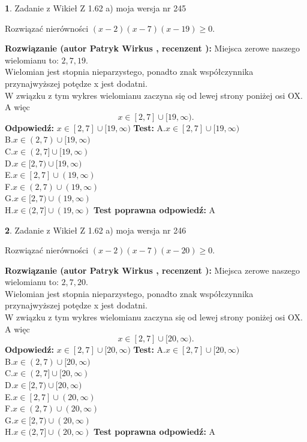 \documentclass[12pt, a4paper]{article}
\theoremstyle{definition} %
\newtheorem{zad}{}
\newcommand{\zadStart}[1]{\begin{zad}#1\newline}
\newcommand{\zadStop}{\end{zad}}
\newcommand{\rozwStart}[2]{\noindent \textbf{Rozwiązanie (autor #1 , recenzent #2): }\newline}
\newcommand{\rozwStop}{\newline}
\newcommand{\odpStart}{\noindent \textbf{Odpowiedź:}\newline}
\newcommand{\odpStop}{\newline}
\newcommand{\testStart}{\noindent \textbf{Test:}\newline}
\newcommand{\testStop}{\newline}
\newcommand{\kluczStart}{\noindent \textbf{Test poprawna odpowiedź:}\newline}
\newcommand{\kluczStop}{\newline}
\begin{document}
\zadStart{Zadanie z Wikieł Z 1.62 a) moja wersja nr 245}

Rozwiązać nierówności $(x-2)(x-7)(x-19)\ge0$.
\zadStop
\rozwStart{Patryk Wirkus}{}
Miejsca zerowe naszego wielomianu to: $2, 7, 19$.\\
Wielomian jest stopnia nieparzystego, ponadto znak współczynnika przy\linebreak najwyższej potędze x jest dodatni.\\ W związku z tym wykres wielomianu zaczyna się od lewej strony poniżej osi OX. A więc $$x \in [2,7] \cup [19,\infty).$$
\rozwStop
\odpStart
$x \in [2,7] \cup [19,\infty)$
\odpStop
\testStart
A.$x \in [2,7] \cup [19,\infty)$\\
B.$x \in (2,7) \cup [19,\infty)$\\
C.$x \in (2,7] \cup [19,\infty)$\\
D.$x \in [2,7) \cup [19,\infty)$\\
E.$x \in [2,7] \cup (19,\infty)$\\
F.$x \in (2,7) \cup (19,\infty)$\\
G.$x \in [2,7) \cup (19,\infty)$\\
H.$x \in (2,7] \cup (19,\infty)$
\testStop
\kluczStart
A
\kluczStop



\zadStart{Zadanie z Wikieł Z 1.62 a) moja wersja nr 246}

Rozwiązać nierówności $(x-2)(x-7)(x-20)\ge0$.
\zadStop
\rozwStart{Patryk Wirkus}{}
Miejsca zerowe naszego wielomianu to: $2, 7, 20$.\\
Wielomian jest stopnia nieparzystego, ponadto znak współczynnika przy\linebreak najwyższej potędze x jest dodatni.\\ W związku z tym wykres wielomianu zaczyna się od lewej strony poniżej osi OX. A więc $$x \in [2,7] \cup [20,\infty).$$
\rozwStop
\odpStart
$x \in [2,7] \cup [20,\infty)$
\odpStop
\testStart
A.$x \in [2,7] \cup [20,\infty)$\\
B.$x \in (2,7) \cup [20,\infty)$\\
C.$x \in (2,7] \cup [20,\infty)$\\
D.$x \in [2,7) \cup [20,\infty)$\\
E.$x \in [2,7] \cup (20,\infty)$\\
F.$x \in (2,7) \cup (20,\infty)$\\
G.$x \in [2,7) \cup (20,\infty)$\\
H.$x \in (2,7] \cup (20,\infty)$
\testStop
\kluczStart
A
\kluczStop
\end{document}
